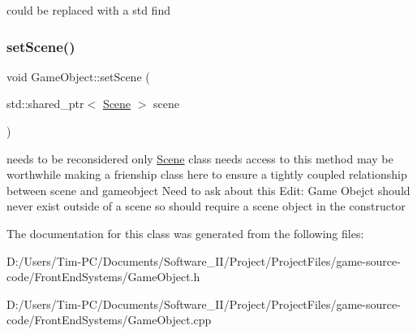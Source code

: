 could be replaced with a std find \mbox{\label{class_game_object_a9e1420c027ce937f9958a41ad280080b}} 
\subsubsection{\texorpdfstring{set\+Scene()}{setScene()}}
{\footnotesize\ttfamily void Game\+Object\+::set\+Scene (\begin{DoxyParamCaption}\item[{std\+::shared\+\_\+ptr$<$ \hyperlink{class_scene}{Scene} $>$}]{scene }\end{DoxyParamCaption})\hspace{0.3cm}{\ttfamily [inline]}}

needs to be reconsidered only \hyperlink{class_scene}{Scene} class needs access to this method may be worthwhile making a frienship class here to ensure a tightly coupled relationship between scene and gameobject Need to ask about this Edit\+: Game Obejct should never exist outside of a scene so should require a scene object in the constructor 

The documentation for this class was generated from the following files\+:\begin{DoxyCompactItemize}
\item 
D\+:/\+Users/\+Tim-\/\+P\+C/\+Documents/\+Software\+\_\+\+I\+I/\+Project/\+Project\+Files/game-\/source-\/code/\+Front\+End\+Systems/Game\+Object.\+h\item 
D\+:/\+Users/\+Tim-\/\+P\+C/\+Documents/\+Software\+\_\+\+I\+I/\+Project/\+Project\+Files/game-\/source-\/code/\+Front\+End\+Systems/Game\+Object.\+cpp\end{DoxyCompactItemize}
